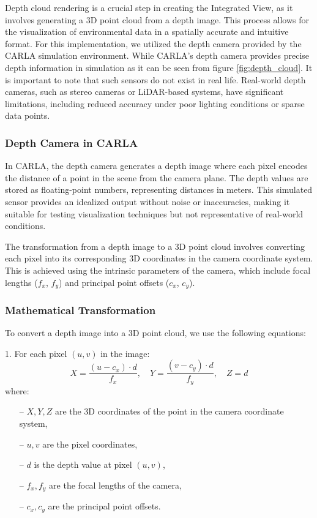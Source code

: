 Depth cloud rendering is a crucial step in creating the Integrated View, as it involves generating a 3D point cloud from a depth image. This process allows for the visualization of environmental data in a spatially accurate and intuitive format. For this implementation, we utilized the depth camera provided by the CARLA simulation environment. While CARLA's depth camera provides precise depth information in simulation as it can be seen from figure \ref{fig:depth_cloud}. It is important to note that such sensors do not exist in real life. Real-world depth cameras, such as stereo cameras or LiDAR-based systems, have significant limitations, including reduced accuracy under poor lighting conditions or sparse data points.

\subsubsection{Depth Camera in CARLA}

In CARLA, the depth camera generates a depth image where each pixel encodes the distance of a point in the scene from the camera plane. The depth values are stored as floating-point numbers, representing distances in meters. This simulated sensor provides an idealized output without noise or inaccuracies, making it suitable for testing visualization techniques but not representative of real-world conditions.

The transformation from a depth image to a 3D point cloud involves converting each pixel into its corresponding 3D coordinates in the camera coordinate system. This is achieved using the intrinsic parameters of the camera, which include focal lengths (\(f_x\), \(f_y\)) and principal point offsets (\(c_x\), \(c_y\)).

\subsubsection{Mathematical Transformation}

To convert a depth image into a 3D point cloud, we use the following equations:

1. For each pixel \((u, v)\) in the image:
   \[
   X = \frac{(u - c_x) \cdot d}{f_x}, \quad
   Y = \frac{(v - c_y) \cdot d}{f_y}, \quad
   Z = d
   \]
   where:
   \begin{itemize}
    \item[--] \(X, Y, Z\) are the 3D coordinates of the point in the camera coordinate system,
    \item[--] \(u, v\) are the pixel coordinates,
    \item[--] \(d\) is the depth value at pixel \((u, v)\),
    \item[--] \(f_x, f_y\) are the focal lengths of the camera,
    \item[--] \(c_x, c_y\) are the principal point offsets.
   \end{itemize}

